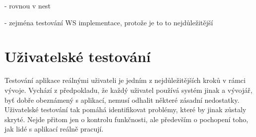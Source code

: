 - rovnou v nest

- zejména testování WS implementace, protože je to to nejdůležitější







\section{Uživatelské testování}

Testování aplikace reálnými uživateli je jedním z nejdůležitějších kroků v rámci vývoje. 
Vychází z předpokladu, že každý uživatel používá systém jinak a vývojář, byť dobře obeznámený s aplikací, nemusí odhalit některé zásadní nedostatky. 
Uživatelské testování tak pomáhá identifikovat problémy, které by jinak zůstaly skryté. 
Nejde přitom jen o kontrolu funkčnosti, ale především o pochopení toho, jak lidé s aplikací reálně pracují.


